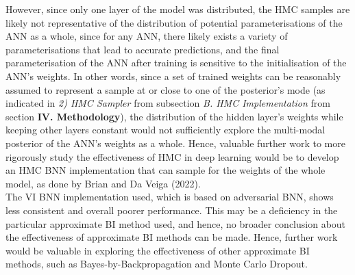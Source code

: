 \documentclass[conference]{IEEEtran}
\begin{document}
However, since only one layer of the model was distributed, the HMC samples are likely not representative of the distribution of potential parameterisations of the ANN as a whole, since for any ANN, there likely exists a variety of parameterisations that lead to accurate predictions, and the final parameterisation of the ANN after training is sensitive to the initialisation of the ANN's weights. In other words, since a set of trained weights can be reasonably assumed to represent a sample at or close to one of the posterior's mode (as indicated in \textit{2) HMC Sampler} from subsection \textit{B. HMC Implementation} from section \textbf{IV. Methodology}), the distribution of the hidden layer's weights while keeping other layers constant would not sufficiently explore the multi-modal posterior of the ANN's weights as a whole. Hence, valuable further work to more rigorously study the effectiveness of HMC in deep learning would be to develop an HMC BNN implementation that can sample for the weights of the whole model, as done by Brian and Da Veiga (2022).\\

The VI BNN implementation used, which is based on adversarial BNN, shows less consistent and overall poorer performance. This may be a deficiency in the particular approximate BI method used, and hence, no broader conclusion about the effectiveness of approximate BI methods can be made. Hence, further work would be valuable in exploring the effectiveness of other approximate BI methods, such as Bayes-by-Backpropagation and Monte Carlo Dropout.\\
\end{document}
